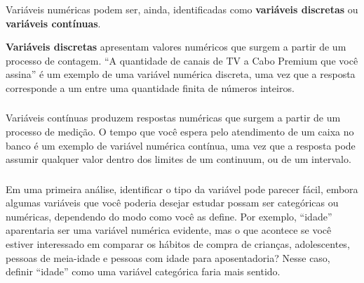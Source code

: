 \documentclass[14pt,aspectratio=1610]{beamer}
\begin{document}
\begin{frame}{}
\frametitle{}
\begin{block}{}
\justifying
Variáveis numéricas podem ser, ainda, identificadas como \textbf{variáveis discretas} ou \textbf{variáveis contínuas}.
\end{block}
\pause
\begin{block}{}
\justifying
\textbf{Variáveis discretas} apresentam valores numéricos que surgem a partir de um processo de contagem. ``A quantidade de canais de TV a Cabo Premium que você 
assina'' é um exemplo de uma variável numérica discreta, uma vez que a resposta corresponde a um entre uma quantidade finita de números inteiros.
\end{block}
\end{frame}

\begin{frame}{}
\frametitle{}
\begin{block}{}
\justifying
Variáveis contínuas produzem respostas numéricas que surgem a partir de um processo de medição. O tempo que você espera pelo atendimento de um caixa no banco 
é um exemplo de variável numérica contínua, uma vez que a resposta pode assumir qualquer valor dentro dos limites de um continuum, ou de um intervalo.
\end{block}
\end{frame}

\begin{frame}{}
\frametitle{}
\begin{block}{}
\justifying
Em uma primeira análise, identificar o tipo da variável pode parecer fácil, embora algumas variáveis que você poderia desejar estudar possam ser categóricas ou numéricas, 
dependendo do modo como você as define. Por exemplo, ``idade'' aparentaria ser uma variável numérica evidente, mas o que acontece se você estiver interessado em 
comparar os hábitos de compra de crianças, adolescentes, pessoas de meia-idade e pessoas com idade para aposentadoria? Nesse caso, definir ``idade'' como uma 
variável categórica faria mais sentido. 
\end{block}
\end{frame}
\end{document}
